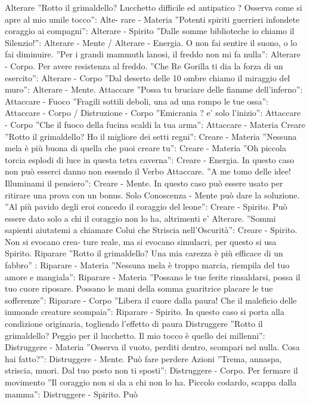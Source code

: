 \documentclass[12pt,a4paper,twoside,openany,twocolumn]{book}
\begin{document}
Alterare
”Rotto il grimaldello? Lucchetto difficile ed antipatico ? Osserva come si apre al mio umile tocco”: Alte-
rare - Materia
”Potenti spiriti guerrieri infondete coraggio ai compagni”: Alterare - Spirito
”Dalle somme biblioteche io chiamo il Silenzio!”: Alterare - Mente / Alterare - Energia. O non fai sentire il
suono, o lo fai diminuire.
”Per i grandi mammuth lanosi, il freddo non mi fa nulla”: Alterare - Corpo. Per avere resistenza al freddo.
”Che Re Gorilla ti dia la forza di un esercito”: Alterare - Corpo
”Dal deserto delle 10 ombre chiamo il miraggio del muro”: Alterare - Mente.
Attaccare
”Possa tu bruciare delle fiamme dell’inferno”: Attaccare - Fuoco
”Fragili sottili deboli, una ad una rompo le tue ossa”: Attaccare - Corpo / Distruzione - Corpo
”Emicrania ? e’ solo l’inizio”: Attaccare - Corpo
”Che il fuoco della fucina scaldi la tua arma”: Attaccare - Materia
Creare
”Rotto il grimaldello? Ho il migliore dei setti regni”: Creare - Materia
”Nessuna mela è più buona di quella che puoi creare tu”: Creare - Materia
”Oh piccola torcia esplodi di luce in questa tetra caverna”: Creare - Energia. In questo caso non può esserci
danno non essendo il Verbo Attaccare.
”A me tomo delle idee! Illuminami il pensiero”: Creare - Mente. In questo caso può essere usato per ritirare
una prova con un bonus. Solo Conoscenza - Mente può dare la soluzione.
”Al più pavido degli eroi concedo il coraggio del leone”: Creare - Spirito. Può essere dato solo a chi il coraggio
non lo ha, altrimenti e’ Alterare.
”Sommi sapienti aiutatemi a chiamare Colui che Striscia nell’Oscurità”: Creare - Spirito. Non si evocano crea-
ture reale, ma si evocano simulacri, per questo si usa Spirito.
Riparare
”Rotto il grimaldello? Una mia carezza è più efficace di un fabbro” : Riparare - Materia
”Nessuna mela è troppo marcia, riempila del tuo amore e mangiala”: Riparare - Materia
”Possano le tue ferite rinsaldarsi, possa il tuo cuore riposare. Possano le mani della somma guaritrice placare
le tue sofferenze”: Riparare - Corpo
”Libera il cuore dalla paura! Che il maleficio delle immonde creature scompaia”: Riparare - Spirito. In questo
caso si porta alla condizione originaria, togliendo l’effetto di paura
Distruggere
”Rotto il grimaldello? Peggio per il lucchetto. Il mio tocco è quello dei millenni”: Distruggere - Materia
”Osserva il vuoto, perditi dentro, scompari nel nulla. Cosa hai fatto?”: Distruggere - Mente. Può fare perdere
Azioni
”Trema, annaspa, striscia, muori. Dal tuo posto non ti sposti”: Distruggere - Corpo. Per fermare il movimento
”Il coraggio non si da a chi non lo ha. Piccolo codardo, scappa dalla mamma”: Distruggere - Spirito. Può
\end{document}
